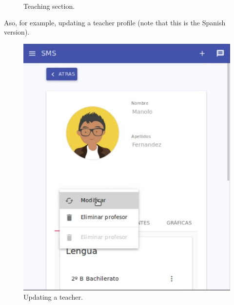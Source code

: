 \begin{figure}[H]
\begin{minipage}{.5\textwidth}
  \caption{Teaching section.}
\end{minipage}
\end{figure}

\noindent Aso, for example, updating a teacher profile (note that this is
the Spanish version).

\begin{figure}[H]
\centering
\begin{minipage}{.5\textwidth}
  \centering
  \includegraphics[scale=0.3]{img/snaps/teacher_profile_update.png}
  \caption{Updating a teacher.}
\end{minipage}%
\begin{minipage}{.5\textwidth}
  \centering

\end{minipage}
\end{figure}
